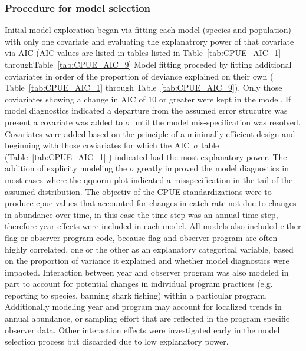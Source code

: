 \subsubsection{Procedure for model selection}
Initial model exploration began via fitting each model (species and population) with only one covariate and evaluating the explanatrory power of that covariate via AIC  (AIC values are listed in tables  listed in Table~\ref{tab:CPUE_AIC_1} throughTable~\ref{tab:CPUE_AIC_9} %
Model fitting proceded by fitting additional coviariates in order of the proportion of deviance explained  on their own ( Table~\ref{tab:CPUE_AIC_1} through Table~\ref{tab:CPUE_AIC_9}).  Only those coviariates showing a change in AIC of 10 or greater were kept in the model.
If model diagnostics indicated a departure from the assumed error strucutre was present a covariate was added to $\sigma$ until the model mis-specification was resolved. Covariates were added based on the principle of a minimally efficient design and beginning with those coviariates for which the AIC~$\sigma$ table (Table~\ref{tab:CPUE_AIC_1} ) indicated had the most explanatory power.  
The addition of explicity modeling the $\sigma$ greatly improved the  model diagnostics in  most cases where the qqnorm plot indicated a misspecification in the tail of the assumed distribution.  The objectiv of the CPUE standardizations were to produce cpue values that accounted for changes in catch rate not due to changes in abundance over time, in this case the time step was an annual time step, therefore year effects were included in each model. 
All models also included either flag or observer program code, because flag and observer program are often highly correlated, one or the other as an explanatory categorical variable, based on the proportion of variance it explained and whether model diagnostics were impacted.
Interaction between year and observer program was also modeled in part to account for potential changes in individual program practices (e.g. reporting to species, banning shark fishing) within a particular program.  Additionally modeling year and program may account for localized trends in annual abundance, or sampling effort that are reflected in the program specific observer data. Other interaction effects were investigated early in the model selection process but discarded due to low explanatory power.%
 
